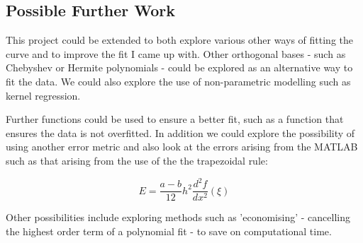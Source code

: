 \documentclass{article}
\begin{document}
\subsection{Possible Further Work} 

This project could be extended to both explore various other ways of fitting the curve and to improve the fit I came up with. Other orthogonal bases - such as Chebyshev or Hermite polynomials - could be explored as an alternative way to fit the data. We could also explore the use of non-parametric modelling such as kernel regression.

Further functions could be used to ensure a better fit, such as a function that ensures the data is not overfitted. In addition we could explore the possibility of using another error metric and also look at the errors arising from the MATLAB such as that arising from the use of the the trapezoidal rule:

\begin{equation}
E = \frac{a-b}{12}h^2\frac{d^2 f}{dx^2}(\xi)
\end{equation}

Other possibilities include exploring methods such as 'economising' - cancelling the highest order term of a polynomial fit - to save on computational time.
\end{document}
